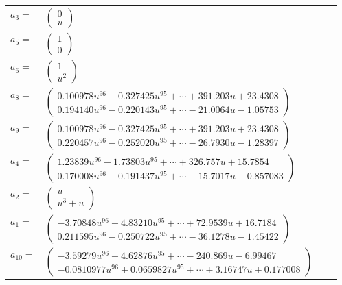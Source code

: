 \documentclass[1p]{elsarticle_modified}
\theoremstyle{definition}
\begin{document}
\begin{tabular}{m{7pt} m{180pt} m{7pt} m{180pt} }
\flushright $a_{3}=$&$\begin{pmatrix}0\\u\end{pmatrix}$ \\
\flushright $a_{5}=$&$\begin{pmatrix}1\\0\end{pmatrix}$ \\
\flushright $a_{6}=$&$\begin{pmatrix}1\\u^2\end{pmatrix}$ \\
\flushright $a_{8}=$&$\begin{pmatrix}0.100978 u^{96}-0.327425 u^{95}+\cdots+391.203 u+23.4308\\0.194140 u^{96}-0.220143 u^{95}+\cdots-21.0064 u-1.05753\end{pmatrix}$ \\
\flushright $a_{9}=$&$\begin{pmatrix}0.100978 u^{96}-0.327425 u^{95}+\cdots+391.203 u+23.4308\\0.220457 u^{96}-0.252020 u^{95}+\cdots-26.7930 u-1.28397\end{pmatrix}$ \\
\flushright $a_{4}=$&$\begin{pmatrix}1.23839 u^{96}-1.73803 u^{95}+\cdots+326.757 u+15.7854\\0.170008 u^{96}-0.191437 u^{95}+\cdots-15.7017 u-0.857083\end{pmatrix}$ \\
\flushright $a_{2}=$&$\begin{pmatrix}u\\u^3+u\end{pmatrix}$ \\
\flushright $a_{1}=$&$\begin{pmatrix}-3.70848 u^{96}+4.83210 u^{95}+\cdots+72.9539 u+16.7184\\0.211595 u^{96}-0.250722 u^{95}+\cdots-36.1278 u-1.45422\end{pmatrix}$ \\
\flushright $a_{10}=$&$\begin{pmatrix}-3.59279 u^{96}+4.62876 u^{95}+\cdots-240.869 u-6.99467\\-0.0810977 u^{96}+0.0659827 u^{95}+\cdots+3.16747 u+0.177008\end{pmatrix}$ \\

\end{tabular}
\end{document}
